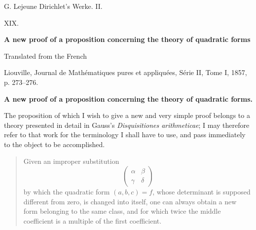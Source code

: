 \documentclass[11pt]{article}
\begin{document}
\begin{center}
{\Large G. Lejeune Dirichlet's Werke. II.}\par\vspace{1.2em}
{\Large XIX.}\par\vspace{0.5em}
{\LARGE \textbf{A new proof of a proposition concerning the theory of quadratic forms}}\par\vspace{1em}
{\large Translated from the French}\par\vspace{0.5em}
{\small Liouville, Journal de Mathématiques pures et appliquées, Série II, Tome I, 1857, p. 273--276.}
\end{center}

\bigskip
\begin{center}
{\large \textbf{A new proof of a proposition concerning the theory of quadratic forms.}}
\end{center}

The proposition of which I wish to give a new and very simple proof belongs to a theory presented in detail in Gauss's \emph{Disquisitiones arithmeticae}; I may therefore refer to that work for the terminology I shall have to use, and pass immediately to the object to be accomplished.

\begin{quote}
Given an improper substitution
\[
\begin{pmatrix}\alpha&\beta\\ \gamma&\delta\end{pmatrix}
\]
by which the quadratic form \((a,b,c)=f\), whose determinant is supposed different from zero, is changed into itself, one can always obtain a new form belonging to the same class, and for which twice the middle coefficient is a multiple of the first coefficient.
\end{quote}
\end{document}

